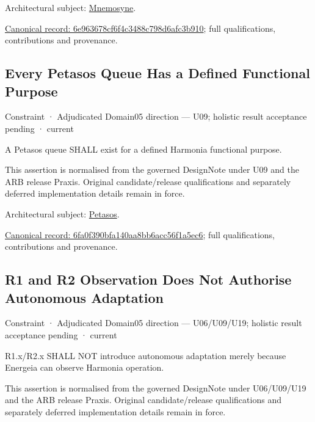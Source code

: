 Architectural subject: \hyperref[element:7985e647bf9e4ca3ba70faf9e3e4ae02]{Mnemosyne}.


{\footnotesize \href{../../../../continuum/motivation/constraint/6e963678cf6f4c3488c798d6afc3b910.md}{Canonical record: 6e963678cf6f4c3488c798d6afc3b910}; full qualifications, contributions and provenance.}\par
\subsection{Every Petasos Queue Has a Defined Functional Purpose}

\label{element:6fa0f390bfa140aa8bb6acc56f1a5ec6}
{\small Constraint · Adjudicated Domain05 direction — U09; holistic result acceptance pending · current}\par

A Petasos queue SHALL exist for a defined Harmonia functional purpose.



This assertion is normalised from the governed DesignNote under U09 and the ARB release Praxis. Original candidate/release qualifications and separately deferred implementation details remain in force.



Architectural subject: \hyperref[element:195e5f10db8e419391354197b5d7a8cc]{Petasos}.


{\footnotesize \href{../../../../continuum/motivation/constraint/6fa0f390bfa140aa8bb6acc56f1a5ec6.md}{Canonical record: 6fa0f390bfa140aa8bb6acc56f1a5ec6}; full qualifications, contributions and provenance.}\par
\subsection{R1 and R2 Observation Does Not Authorise Autonomous Adaptation}

\label{element:7ca8481aa04a4dfdb34766511e002a5b}
{\small Constraint · Adjudicated Domain05 direction — U06/U09/U19; holistic result acceptance pending · current}\par

R1.x/R2.x SHALL NOT introduce autonomous adaptation merely because Energeia can observe Harmonia operation.



This assertion is normalised from the governed DesignNote under U06/U09/U19 and the ARB release Praxis. Original candidate/release qualifications and separately deferred implementation details remain in force.



